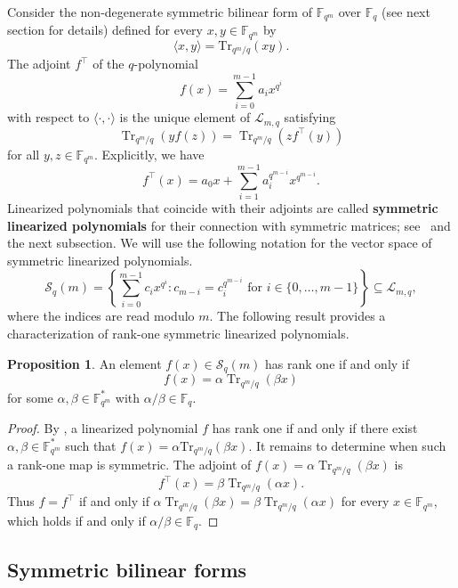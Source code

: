 \documentclass[11pt,a4paper,reqno]{article}
\numberwithin{equation}{section}
\theoremstyle{definition}
\newtheorem{proposition}[theorem]{Proposition}
\newcommand{\numberset}{\mathbb}
\newcommand{\F}{\numberset{F}}
\newcommand{\fqm}{\F_{q^m}}
\begin{document}
Consider the non-degenerate symmetric bilinear form of $\F_{q^m}$ over $\F_q$ (see next section for details) defined for every $x,y \in \F_{q^m}$ by
\begin{equation}\label{eq:bilform} \langle x,y\rangle= \mathrm{Tr}_{q^m/q}(xy). \end{equation}
The adjoint \(f^\top\) of the \(q\)-polynomial
\[
f(x)=\sum_{i=0}^{m-1}a_i x^{q^i}
\]
with respect to \(\langle\cdot,\cdot\rangle\) is the unique element of
\(\mathcal L_{m,q}\) satisfying
\[
\operatorname{Tr}_{q^m/q}(y f(z))
=
\operatorname{Tr}_{q^m/q}(z f^\top(y))
\]
for all \(y,z\in\mathbb F_{q^m}\). Explicitly, we have
\[
f^\top(x)
=
a_0x+\sum_{i=1}^{m-1} a_i^{q^{m-i}}x^{q^{m-i}}.
\]
Linearized polynomials that coincide with their adjoints are called \textbf{symmetric linearized polynomials} for their connection with symmetric matrices; see~\cite{longobardi2020automorphism} and the next subsection. We will use the following notation for the vector space of symmetric linearized
polynomials.
\[
\mathcal S_q(m)=
\left\{
\sum_{i=0}^{m-1} c_i x^{q^i}
:
c_{m-i}=c_i^{q^{m-i}}
\text{ for } i\in\{0,\ldots,m-1\}
\right\}
\subseteq \mathcal L_{m,q},
\]
where the indices are read modulo \(m\). The following result provides a characterization of rank-one symmetric linearized polynomials.

\begin{proposition}\label{prop:rank1sym}
An element \(f(x)\in \mathcal S_q(m)\) has rank one if and only if
\[
f(x)=\alpha\operatorname{Tr}_{q^m/q}(\beta x)
\]
for some \(\alpha,\beta\in\mathbb F_{q^m}^*\) with \(\alpha/\beta\in\mathbb F_q\).
\end{proposition}
\begin{proof}
    By \cite[Theorem 2.24]{lidl1997finite}, a linearized polynomial $f$ has rank one if and only if there exist $\alpha, \beta \in \fqm^*$ such that $f(x)=\alpha \mathrm{Tr}_{q^m/q}(\beta x)$. It remains to determine when such a rank-one map is symmetric. The adjoint of $f(x)=\alpha\operatorname{Tr}_{q^m/q}(\beta x)$ is
\[
f^\top(x)=\beta\operatorname{Tr}_{q^m/q}(\alpha x).
\]
Thus \(f=f^\top\) if and only if $\alpha\operatorname{Tr}_{q^m/q}(\beta x)
=
\beta\operatorname{Tr}_{q^m/q}(\alpha x)$ for every \(x\in\mathbb F_{q^m}\), which holds if and only if
\(\alpha/\beta\in\mathbb F_q\).
\end{proof}

\subsection{Symmetric bilinear forms}
\end{document}
